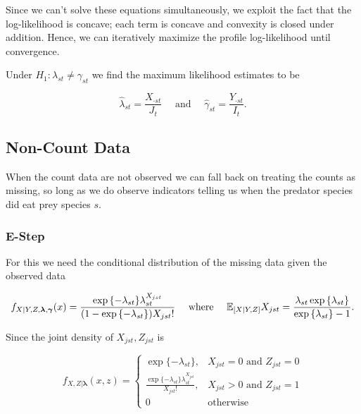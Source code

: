 \documentclass[12pt]{article}\usepackage[]{graphicx}\usepackage[]{color}
\begin{document}
\noindent Since we can't solve these equations simultaneously, we exploit the fact that the log-likelihood is concave; each term is concave and convexity is closed under addition.  Hence, we can iteratively maximize the profile log-likelihood until convergence.  

Under $H_1: \lambda_{st} \ne \gamma_{st}$ we find the maximum likelihood estimates to be

\begin{equation*}
  \hat{\lambda}_{st} = \frac{X_{\cdot st}}{J_{t}} \quad \text{ and } \quad \hat{\gamma}_{st} = \frac{Y_{\cdot st}}{I_{t}}.
\end{equation*}

\subsection{Non-Count Data}

When the count data are not observed we can fall back on treating the counts as missing, so long as we do observe indicators telling us when the predator species did eat prey species $s$.  

\subsubsection*{E-Step}
For this we need the conditional distribution of the missing data given the observed data

\begin{equation*}
  f_{X|Y,Z,\boldsymbol{\lambda},\boldsymbol{\gamma}}(x) = \frac{\exp{\{-\lambda_{st}\}} \lambda_{st}^{X_{jst}}}{(1 - \exp{\{-\lambda_{st}\}}) X_{jst}!} \quad \text{ where } \quad \mathbb{E}_{[X|Y,Z]}X_{jst} = \frac{\lambda_{st} \exp{\{\lambda_{st} \}}}{\exp{\{ \lambda_{st} \}} - 1}.
\end{equation*}

Since the joint density of $X_{jst}, Z_{jst}$ is

\begin{equation*}
  f_{X,Z|\boldsymbol{\lambda}}(x,z) = \left\{
    \begin{array}{lr}
      \exp{\{ -\lambda_{st} \}}, & X_{jst}=0 \mbox{ and } Z_{jst} = 0 \\
      \frac{\exp{\{-\lambda_{st} \}} \lambda_{st}^{X_{jst}}}{X_{jst}!}, & X_{jst} > 0 \mbox{ and } Z_{jst} = 1\\
      0 & \mbox{otherwise}
    \end{array}
  \right.
\end{equation*}
\end{document}
